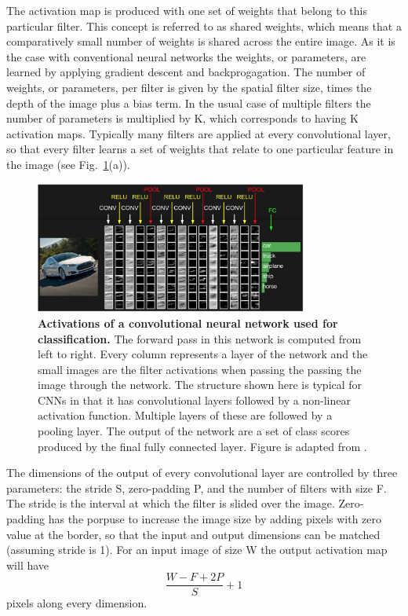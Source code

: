 The activation map is produced with one set of weights that belong to this particular filter. This concept is referred to as shared weights, which means that a comparatively small number of weights is shared across the entire image. As it is the case with conventional neural networks the weights, or parameters, are learned by applying gradient descent and backprogagation.  The number of weights, or parameters, per filter is given by the spatial filter size, times the depth of the image plus a bias term. In the usual case of multiple filters the number of parameters is multiplied by K, which corresponds to having K activation maps. Typically many filters are applied at every convolutional layer, so that every filter learns a set of weights that relate to one particular feature in the image (see Fig.~\ref{fig:convnet}(a)). 


\begin{figure}[h!]
	\centering
	\captionsetup{width=1\linewidth}
	\includegraphics[width=0.8\textwidth]{Figures/convnet.png}
	\caption{\textbf{Activations of a convolutional neural network used for classification.} The forward pass in this network is computed from left to right. Every column represents a layer of the network and the small images are the filter activations when passing the passing the image through the network. The structure shown here is typical for CNNs in that it has convolutional layers followed by a non-linear activation function. Multiple layers of these are followed by a pooling layer. The output of the network are a set of class scores produced by the final fully connected layer. Figure is adapted from \parencite{cs231}.}
	\label{fig:convnet}
\end{figure}

The dimensions of the output of every convolutional layer are controlled by three parameters: the stride S, zero-padding P, and the number of filters with size F. The stride is the interval at which the filter is slided over the image. Zero-padding has the porpuse to increase the image size by adding pixels with zero value at the border, so that the input and output dimensions can be matched (assuming stride is 1). For an input image of size W the output activation map will have
\begin{equation}
\frac{W - F +2P}{S} + 1
\end{equation}
pixels along every dimension. 

